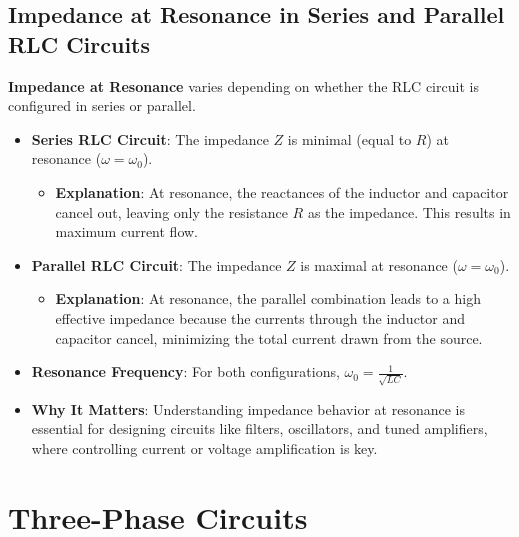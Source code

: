 \documentclass[12pt]{article}
\newcommand{\concept}[1]{\textbf{#1}}
\begin{document}
\subsection{Impedance at Resonance in Series and Parallel RLC Circuits}
\concept{Impedance at Resonance} varies depending on whether the RLC circuit is configured in series or parallel.
\begin{itemize}
    \item \textbf{Series RLC Circuit}: The impedance \(Z\) is minimal (equal to \(R\)) at resonance (\(\omega = \omega_0\)).
        \begin{itemize}
            \item \textbf{Explanation}: At resonance, the reactances of the inductor and capacitor cancel out, leaving only the resistance \(R\) as the impedance. This results in maximum current flow.
        \end{itemize}
    \item \textbf{Parallel RLC Circuit}: The impedance \(Z\) is maximal at resonance (\(\omega = \omega_0\)).
        \begin{itemize}
            \item \textbf{Explanation}: At resonance, the parallel combination leads to a high effective impedance because the currents through the inductor and capacitor cancel, minimizing the total current drawn from the source.
        \end{itemize}
    \item \textbf{Resonance Frequency}: For both configurations, \(\omega_0 = \frac{1}{\sqrt{L C}}\).
    \item \textbf{Why It Matters}: Understanding impedance behavior at resonance is essential for designing circuits like filters, oscillators, and tuned amplifiers, where controlling current or voltage amplification is key.
\end{itemize}

\section{Three-Phase Circuits}
\end{document}
